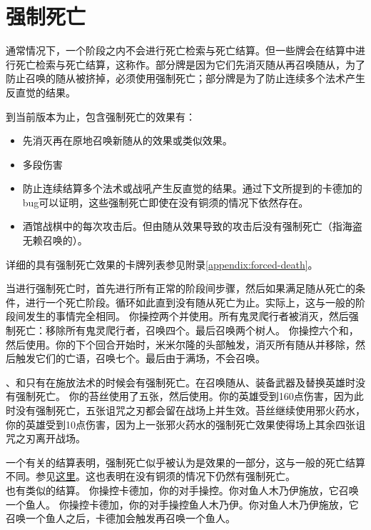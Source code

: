 \section{强制死亡}

通常情况下，一个阶段之内不会进行死亡检索与死亡结算。但一些牌会在结算中进行死亡检索与死亡结算，这称作。部分牌是因为它们先消灭随从再召唤随从，为了防止召唤的随从被挤掉，必须使用强制死亡；部分牌是为了防止连续多个法术产生反直觉的结果。

到当前版本为止，包含强制死亡的效果有：
\begin{itemize}
    \item 先消灭再在原地召唤新随从的效果或类似效果。
    \item 多段伤害
    \item 防止连续结算多个法术或战吼产生反直觉的结果。通过下文所提到的卡德加的bug可以证明，这些强制死亡即使在没有铜须的情况下依然存在。
    \item 酒馆战棋中的每次攻击后。但由随从效果导致的攻击后没有强制死亡（指海盗无赖召唤的）。
\end{itemize}
详细的具有强制死亡效果的卡牌列表参见附录\ref{appendix:forced-death}。

当进行强制死亡时，首先进行所有正常的阶段间步骤，然后如果满足随从死亡的条件，进行一个死亡阶段。循环如此直到没有随从死亡为止。实际上，这与一般的阶段间发生的事情完全相同。
\example 你操控两个并使用。所有鬼灵爬行者被消灭，然后强制死亡：移除所有鬼灵爬行者，召唤四个。最后召唤两个树人。
\example 你操控六个和，然后使用。你的下个回合开始时，米米尔隆的头部触发，消灭所有随从并移除，然后触发它们的亡语，召唤七个。最后由于满场，不会召唤。

\notice {}、和只有在施放法术的时候会有强制死亡。在召唤随从、装备武器及替换英雄时没有强制死亡。
\example 你的苔丝使用了五张，然后使用。你的英雄受到160点伤害，因为此时没有强制死亡，五张诅咒之刃都会留在战场上并生效。苔丝继续使用邪火药水，你的英雄受到10点伤害，因为上一张邪火药水的强制死亡效果使得场上其余四张诅咒之刃离开战场。

\notice \version{}{}一个有关的结算表明，强制死亡似乎被认为是效果的一部分，这与一般的死亡结算不同。参见\href{https://www.bilibili.com/video/av64643539}{这里}。这也表明在没有铜须的情况下仍然有强制死亡。\\
也有类似的结算。
\example 你操控卡德加，你的对手操控。你对鱼人木乃伊施放，它召唤一个鱼人。
\example 你操控卡德加，你的对手操控鱼人木乃伊。你对鱼人木乃伊施放，它召唤一个鱼人之后，卡德加会触发再召唤一个鱼人。

